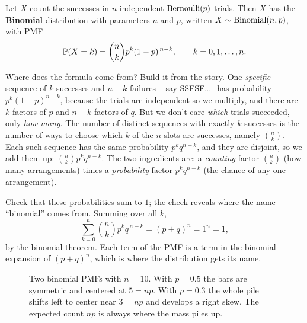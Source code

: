 \begin{definition}
\label{ch07:def-binomial}
Let $X$ count the successes in $n$ independent $\Bern(p)$ trials. Then
$X$ has the \textbf{Binomial} distribution with parameters $n$ and $p$, written
$X \sim \Bin(n,p)$, with PMF
\[
  \P(X = k) = \binom{n}{k} p^{k} (1-p)^{\,n-k}, \qquad k = 0, 1, \dots, n.
\]
\end{definition}

\begin{whybox}
Where does the formula come from? Build it from the story. One \emph{specific}
sequence of $k$ successes and $n-k$ failures -- say SSFSF\dots -- has probability
$p^k (1-p)^{n-k}$, because the trials are independent so we multiply, and there
are $k$ factors of $p$ and $n-k$ factors of $q$. But we don't care \emph{which}
trials succeeded, only \emph{how many}. The number of distinct sequences with
exactly $k$ successes is the number of ways to choose which $k$ of the $n$ slots
are successes, namely $\binom{n}{k}$. Each such sequence has the same probability
$p^k q^{n-k}$, and they are disjoint, so we add them up:
$\binom{n}{k} p^k q^{n-k}$. The two ingredients are: a \emph{counting} factor
$\binom{n}{k}$ (how many arrangements) times a \emph{probability} factor
$p^k q^{n-k}$ (the chance of any one arrangement).
\end{whybox}

Check that these probabilities sum to $1$; the check reveals where the name
``binomial'' comes from. Summing over all $k$,
\[
  \sum_{k=0}^{n} \binom{n}{k} p^{k} q^{\,n-k} = (p + q)^{n} = 1^{n} = 1,
\]
by the binomial theorem. Each term of the PMF is a term in the binomial expansion of
$(p+q)^n$, which is where the distribution gets its name.

\begin{figure}[H]
\centering
{}
\caption{Two binomial PMFs with $n=10$. With $p=0.5$ the bars are symmetric and
centered at $5 = np$. With $p=0.3$ the whole pile shifts left to center near
$3 = np$ and develops a right skew. The expected count $np$ is always where the
mass piles up.}
\label{ch07:fig-binom-pmf}
\end{figure}

